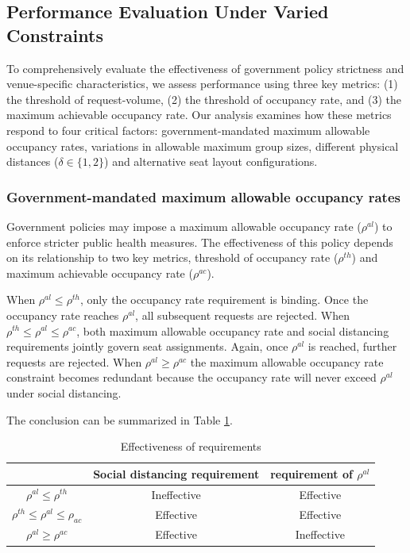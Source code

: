 \subsection{Performance Evaluation Under Varied Constraints}\label{perf_constraints}
To comprehensively evaluate the effectiveness of government policy strictness and venue-specific characteristics, we assess performance using three key metrics: (1) the threshold of request-volume, (2) the threshold of occupancy rate, and (3) the maximum achievable occupancy rate. Our analysis examines how these metrics respond to four critical factors: government-mandated maximum allowable occupancy rates, variations in allowable maximum group sizes, different physical distances ($\delta \in \{1,2\}$) and alternative seat layout configurations.


\subsubsection{Government-mandated maximum allowable occupancy rates}

Government policies may impose a maximum allowable occupancy rate ($\rho^{al}$) to enforce stricter public health measures. The effectiveness of this policy depends on its relationship to two key metrics, threshold of occupancy rate ($\rho^{th}$) and maximum achievable occupancy rate ($\rho^{ac}$).

When $\rho^{al} \leq \rho^{th}$, only the occupancy rate requirement is binding. Once the occupancy rate reaches $\rho^{al}$, all subsequent requests are rejected. When $\rho^{th} \leq \rho^{al} \leq \rho^{ac}$, both maximum allowable occupancy rate and social distancing requirements jointly govern seat assignments. Again, once $\rho^{al}$ is reached, further requests are rejected. When $\rho^{al} \geq \rho^{ac}$ the maximum allowable occupancy rate constraint becomes redundant because the occupancy rate will never exceed $\rho^{al}$ under social distancing.


The conclusion can be summarized in Table \ref{tab_requirement}.
\begin{table}[ht]
  \centering
  \caption{Effectiveness of requirements}\label{tab_requirement}
  \begin{tabular}{ccc}
  \hline
   & Social distancing requirement & requirement of $\rho^{al}$ \\
  \hline
  $\rho^{al} \leq \rho^{th}$            & Ineffective & Effective \\
  $\rho^{th} \leq \rho^{al} \leq \rho_{ac}$  & Effective   & Effective \\
  $\rho^{al} \geq \rho^{ac}$                  & Effective   & Ineffective \\
   \hline
  \end{tabular}
\end{table}

